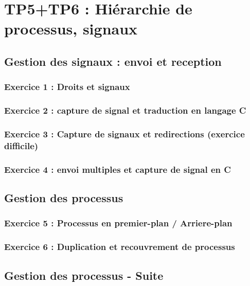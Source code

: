 \chapter{TP5+TP6 : Hiérarchie de processus, signaux}

\section{Gestion des signaux : envoi et reception}

\subsection{Exercice 1 : Droits et signaux}

\subsection{Exercice 2 : capture de signal et traduction en langage C}

\subsection{Exercice 3 : Capture de signaux et redirections (exercice difficile)}

\subsection{Exercice 4 : envoi multiples et capture de signal en C}

\section{Gestion des processus}

\subsection{Exercice 5 : Processus en premier-plan / Arriere-plan}

\subsection{Exercice 6 : Duplication et recouvrement de processus}

\section{Gestion des processus - Suite}

